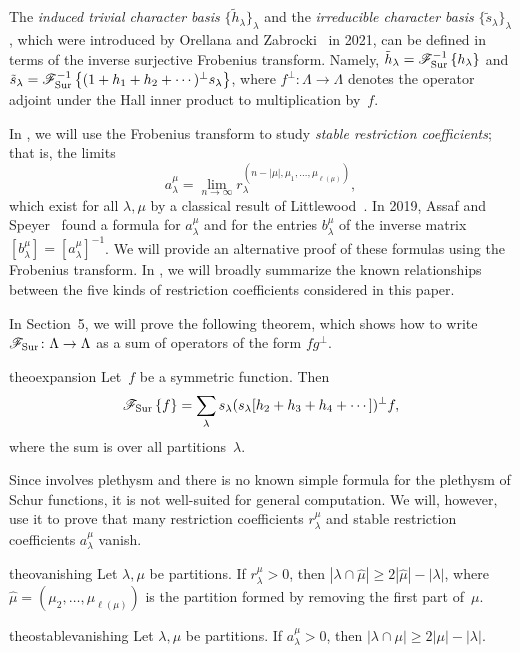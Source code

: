 \documentclass[11pt]{article}
\theoremstyle{definition}
\numberwithin{equation}{section}
\newcommand{\Fa}{\mathscr{F}}
\newcommand{\Sur}{\mathchoice{\operatorname{Sur}}{\operatorname{Sur}}{\mathrm{Sur}}{\mathrm{Sur}}}
\newcommand{\FSur}[1]{\mathscr{F}_{\Sur}\left\{#1\right\}}
\newcommand{\FSurInv}[1]{\mathscr{F}_{\Sur}^{-1}\left\{#1\right\}}
\begin{document}
The \emph{induced trivial character basis} $\{\tilde{h}_\lambda\}_\lambda$ and the \emph{irreducible character basis} $\{\tilde{s}_\lambda\}_\lambda$, which were introduced by Orellana and Zabrocki~\cite{MR4295089} in 2021, can be defined in terms of the inverse surjective Frobenius transform. Namely, $\tilde{h}_\lambda = \FSurInv{h_\lambda}$ and $\tilde{s}_\lambda = \FSurInv{(1 + h_1 + h_2 + \cdots)^{\perp} s_\lambda}$, where $f^\perp\colon \Lambda \to \Lambda$ denotes the operator adjoint under the Hall inner product to multiplication by~$f$.

In , we will use the Frobenius transform to study \emph{stable restriction coefficients}; that is, the limits \[a_\lambda^\mu = \lim_{n \to \infty} r_{\lambda}^{(n - |\mu|, \mu_1, \ldots, \mu_{\ell(\mu)})},\] which exist for all $\lambda, \mu$ by a classical result of Littlewood~\cite{MR1576896}. In 2019, Assaf and Speyer~\cite{MR4055931} found a formula for $a_\lambda^\mu$ and for the entries $b_\lambda^\mu$ of the inverse matrix $[b_\lambda^\mu] = [a_\lambda^\mu]^{-1}$. We will provide an alternative proof of these formulas using the Frobenius transform. In , we will broadly summarize the known relationships between the five kinds of restriction coefficients considered in this paper.

In Section~5, we will prove the following theorem, which shows how to write $\Fa_{\Sur} \colon \Lambda \to \Lambda$ as a sum of operators of the form $fg^\perp$.
\begin{restatable}{theo}{expansion}\label{theorem:expansion}
    Let~$f$ be a symmetric function. Then
    \[
        \FSur{f} = \sum_{\lambda} s_\lambda (s_\lambda[h_2 + h_3 + h_4 + \cdots])^\perp f,
    \]
    where the sum is over all partitions~$\lambda$.
\end{restatable}
Since  involves plethysm and there is no known simple formula for the plethysm of Schur functions, it is not well-suited for general computation. We will, however, use it to prove that many restriction coefficients $r_\lambda^\mu$ and stable restriction coefficients $a_\lambda^\mu$ vanish.
\begin{restatable}{theo}{vanishing}\label{theorem:vanishing}
    Let $\lambda, \mu$ be partitions. If $r_\lambda^\mu > 0$, then $|\lambda \cap \hat \mu| \geq 2|\hat \mu| - |\lambda|$, where $\hat \mu = (\mu_2, \ldots, \mu_{\ell(\mu)})$ is the partition formed by removing the first part of~$\mu$.
\end{restatable}
\begin{restatable}{theo}{stablevanishing}\label{theorem:stablevanishing}
    Let $\lambda, \mu$ be partitions. If $a_\lambda^\mu > 0$, then $|\lambda \cap \mu| \geq 2|\mu| - |\lambda|$.
\end{restatable}
\end{document}
